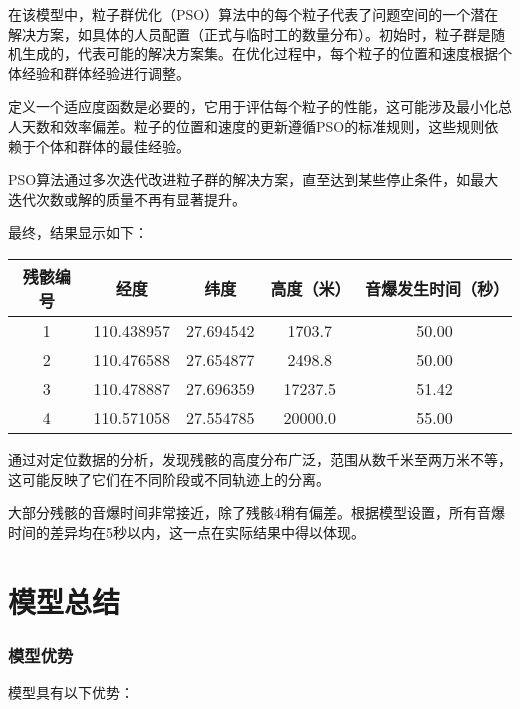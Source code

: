 \documentclass[withoutpreface,bwprint,12pt,a4paper]{cumcmthesis}
\begin{document}
在该模型中，粒子群优化（PSO）算法中的每个粒子代表了问题空间的一个潜在解决方案，如具体的人员配置（正式与临时工的数量分布）。初始时，粒子群是随机生成的，代表可能的解决方案集。在优化过程中，每个粒子的位置和速度根据个体经验和群体经验进行调整。

定义一个适应度函数是必要的，它用于评估每个粒子的性能，这可能涉及最小化总人天数和效率偏差。粒子的位置和速度的更新遵循PSO的标准规则，这些规则依赖于个体和群体的最佳经验。

PSO算法通过多次迭代改进粒子群的解决方案，直至达到某些停止条件，如最大迭代次数或解的质量不再有显著提升。

最终，结果显示如下：

\begin{table}[h!]
\centering
\begin{tabular}{|c|c|c|c|c|}
\hline
残骸编号 & 经度         & 纬度         & 高度（米）   & 音爆发生时间（秒） \\
\hline
1       & 110.438957 & 27.694542 & 1703.7     & 50.00             \\
\hline
2       & 110.476588 & 27.654877 & 2498.8     & 50.00             \\
\hline
3       & 110.478887 & 27.696359 & 17237.5    & 51.42             \\
\hline
4       & 110.571058 & 27.554785 & 20000.0    & 55.00             \\
\hline
\end{tabular}
\label{table:pso_results}
\end{table}

通过对定位数据的分析，发现残骸的高度分布广泛，范围从数千米至两万米不等，这可能反映了它们在不同阶段或不同轨迹上的分离。

大部分残骸的音爆时间非常接近，除了残骸4稍有偏差。根据模型设置，所有音爆时间的差异均在5秒以内，这一点在实际结果中得以体现。

\section{模型总结}

\subsubsection{模型优势}

模型具有以下优势：
\end{document}
